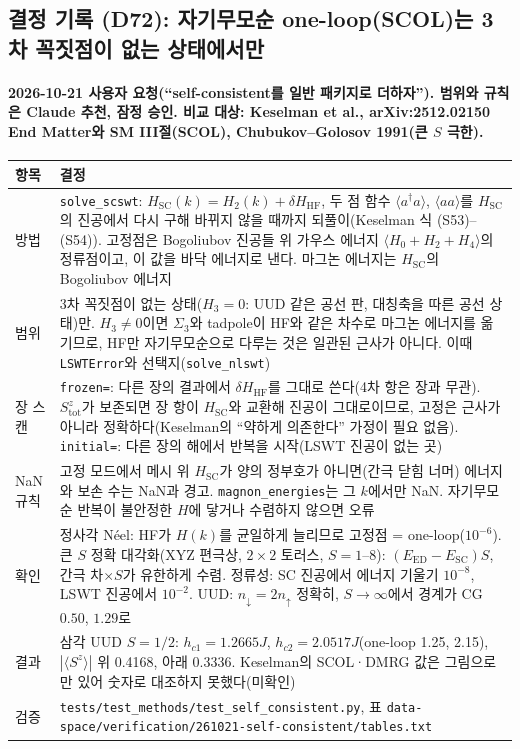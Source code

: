 \subsection{결정 기록 (D72): 자기무모순 one-loop(SCOL)는 3차 꼭짓점이 없는 상태에서만}\label{decisions-d72-self-consistent-one-loop}
\begingroup%
  \framesubtitle{2026-10-21 사용자 요청(``self-consistent를 일반 패키지로 더하자''). 범위와 규칙은 Claude 추천, 잠정 승인. 비교 대상: Keselman et al., arXiv:2512.02150 End Matter와 SM III절(SCOL), Chubukov--Golosov 1991(큰 $S$ 극한).}
  \small\renewcommand{\arraystretch}{1.12}
  \begin{tabularx}{\textwidth}{@{}P{3.0cm}Y@{}}
    \toprule
    항목 & 결정 \\
    \midrule
    방법 & \texttt{solve\_scswt}: $H_\mathrm{SC}(k)=H_2(k)+\delta H_\mathrm{HF}$, 두 점 함수 $\langle a^\dagger a\rangle$, $\langle aa\rangle$를 $H_\mathrm{SC}$의 진공에서 다시 구해 바뀌지 않을 때까지 되풀이(Keselman 식 (S53)--(S54)). 고정점은 Bogoliubov 진공들 위 가우스 에너지 $\langle H_0+H_2+H_4\rangle$의 정류점이고, 이 값을 바닥 에너지로 낸다. 마그논 에너지는 $H_\mathrm{SC}$의 Bogoliubov 에너지 \\
    범위 & 3차 꼭짓점이 없는 상태($H_3=0$: UUD 같은 공선 판, 대칭축을 따른 공선 상태)만. $H_3\neq0$이면 $\Sigma_3$와 tadpole이 HF와 같은 차수로 마그논 에너지를 옮기므로, HF만 자기무모순으로 다루는 것은 일관된 근사가 아니다. 이때 \texttt{LSWTError}와 선택지(\texttt{solve\_nlswt}) \\
    장 스캔 & \texttt{frozen=}: 다른 장의 결과에서 $\delta H_\mathrm{HF}$를 그대로 쓴다(4차 항은 장과 무관). $S^z_\mathrm{tot}$가 보존되면 장 항이 $H_\mathrm{SC}$와 교환해 진공이 그대로이므로, 고정은 근사가 아니라 정확하다(Keselman의 ``약하게 의존한다'' 가정이 필요 없음). \texttt{initial=}: 다른 장의 해에서 반복을 시작(LSWT 진공이 없는 곳) \\
    NaN 규칙 & 고정 모드에서 메시 위 $H_\mathrm{SC}$가 양의 정부호가 아니면(간극 닫힘 너머) 에너지와 보손 수는 NaN과 경고. \texttt{magnon\_energies}는 그 $k$에서만 NaN. 자기무모순 반복이 불안정한 $H$에 닿거나 수렴하지 않으면 오류 \\
    확인 & 정사각 Néel: HF가 $H(k)$를 균일하게 늘리므로 고정점 = one-loop($10^{-6}$). 큰 $S$ 정확 대각화(XYZ 편극상, $2\times2$ 토러스, $S=1$--8): $(E_\mathrm{ED}-E_\mathrm{SC})S$, 간극 차$\times S$가 유한하게 수렴. 정류성: SC 진공에서 에너지 기울기 $10^{-8}$, LSWT 진공에서 $10^{-2}$. UUD: $n_\downarrow=2n_\uparrow$ 정확히, $S\to\infty$에서 경계가 CG $0.50$, $1.29$로 \\
    결과 & 삼각 UUD $S=1/2$: $h_{c1}=1.2665J$, $h_{c2}=2.0517J$(one-loop 1.25, 2.15), $|\langle S^z\rangle|$ 위 0.4168, 아래 0.3336. Keselman의 SCOL·DMRG 값은 그림으로만 있어 숫자로 대조하지 못했다(미확인) \\
    검증 & \texttt{tests/test\_methods/test\_self\_consistent.py}, 표 \texttt{data-space/verification/261021-self-consistent/tables.txt} \\
    \bottomrule
  \end{tabularx}
\endgroup

